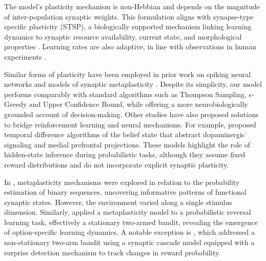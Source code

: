 
The model's plasticity mechanism is non-Hebbian and depends on the magnitude of inter-population synaptic weights.
This formulation aligns with synapse-type specific plasticity (STSP), a biologically supported mechanism linking learning dynamics to synaptic resource availability, current state, and morphological properties \cite{larsenSynapsetypespecificPlasticityLocal2015, blackmanTargetcellspecificShorttermPlasticity2013, bartolHippocampalSpineHead2015, arielIntrinsicVariabilityPv2012}.
Learning rates are also adaptive, in line with observations in human experiments \cite{behrensLearningValueInformation2007}.

Similar forms of plasticity have been employed in prior work on spiking neural networks and models of synaptic metaplasticity \cite{inglisModulationDopamineAdaptive2021, iigayaModulationSavouringPrediction2016}.
Despite its simplicity, our model performs comparably with standard algorithms such as Thompson Sampling, $\epsilon$-Greedy and Upper Confidence Bound, while offering a more neurobiologically grounded account of decision-making.
Other studies have also proposed solutions to bridge reinforcement learning and neural mechanisms.
For example, \cite{starkweatherMedialPrefrontalCortex2018} proposed temporal difference algorithms of the belief state \cite{babayanBeliefStateRepresentation2018} that abstract dopaminergic signaling and medial prefrontal projections.
These models highlight the role of hidden-state inference during probabilistic tasks, although they assume fixed reward distributions and do not incorporate explicit synaptic plasticity. %

In \cite{khorsandOptimalStructureMetaplasticity2017}, metaplasticity mechanisms were explored in relation to the probability estimation of binary sequences, uncovering informative patterns of functional synaptic states.
However, the environment varied along a single stimulus dimension.
Similarly, \cite{farashahiMetaplasticityNeuralSubstrate2017} applied a metaplasticity model to a probabilistic reversal learning task, effectively a stationary two-armed bandit, revealing the emergence of option-specific learning dynamics.
A notable exception is \cite{iigayaAdaptiveLearningDecisionmaking2016}, which addressed a non-stationary two-arm bandit using a synaptic cascade model \cite{fusiCascadeModelsSynaptically2005} equipped with a surprise detection mechanism to track changes in reward probability.


